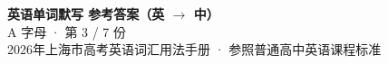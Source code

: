 \documentclass[10pt,a4paper]{article}
\begin{document}
\pagestyle{plain}

\begin{center}
{\LARGE\bfseries 英语单词默写 \quad 参考答案（英 $\to$ 中）}\\[0.22em]
{\large A 字母 · 第 3 / 7 份}\\[0.18em]
{\small 2026年上海市高考英语词汇用法手册 · 参照普通高中英语课程标准}
\end{center}

\vspace{0.2em}
\noindent{\color{rulegray}\rule{\textwidth}{0.8pt}}

\vspace{0.35em}

\vspace{0.25em}
\renewcommand{\arraystretch}{1.32}
\end{document}
